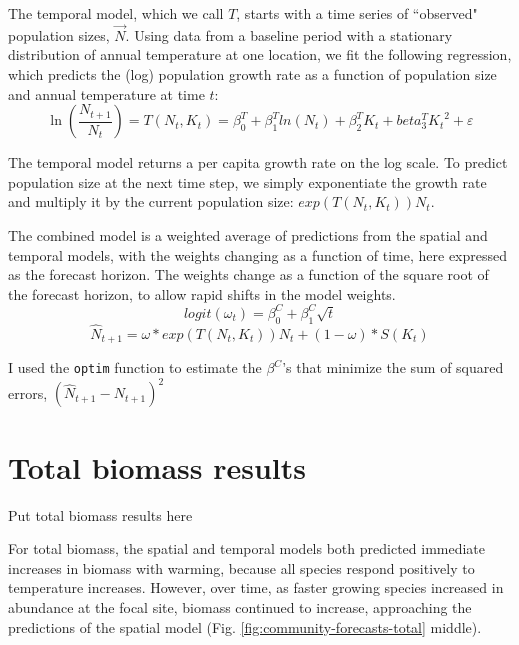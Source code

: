 \documentclass[11pt]{article}
\begin{document}
The temporal model, which we call $T$, starts with a time series of ``observed" population sizes, $\vec{N}$. Using data from a baseline period with a stationary distribution of annual temperature at one location, we fit the following regression, which predicts the (log) population growth rate as a function of population size and annual temperature at time $t$:
 \begin{equation}
 \ln(\frac{N_{t+1}}{N_t}) = T(N_t,K_t) = \beta^T_0 +  \beta^T_1 ln(N_t) +\beta^T_2 K_t + beta^T_3 {K_t}^2 +  \varepsilon
 \label{eqn:temporal_regression}
 \end{equation}
 
The temporal model returns a per capita growth rate on the log scale. To predict population size at the next time step, we simply exponentiate the growth rate and multiply it by the current population size: $exp(T(N_t,K_t)) N_t$.

The combined model is a weighted average of predictions from the spatial and temporal models, with the weights changing as a function of time, here expressed as the forecast horizon. The weights change as a function of the square root of the forecast horizon, to allow rapid shifts in the model weights. 
\begin{equation}
logit(\omega_t)=\beta^C_0 + \beta^C_1 \sqrt{t}
\label{eqn:weights}
\end{equation}
\begin{equation}
\hat{N}_{t+1} = \omega * exp(T(N_{t},K_t)) N_t + (1-\omega) * S(K_t) 
\label{eqn:combined_model}
\end{equation}

I used the \texttt{optim} function to estimate the $\beta^C$'s that minimize the sum of squared errors, $(\hat{N}_{t+1} - N_{t+1})^2$

\section{Total biomass results}\label{biomass}

Put total biomass results here

For total biomass, the spatial and temporal models both predicted immediate increases in biomass with warming, because all species respond positively to temperature increases. 
However, over time, as faster growing species increased in abundance at the focal site, biomass continued to increase, approaching the predictions of the spatial model 
(Fig. \ref{fig:community-forecasts-total} middle).
\end{document}
